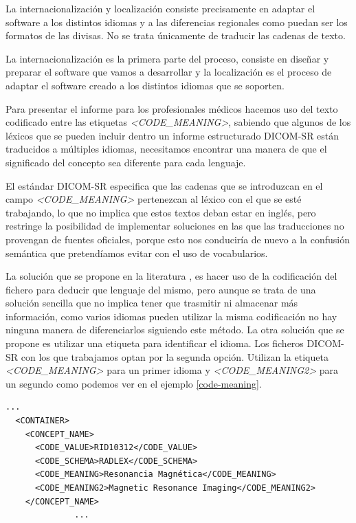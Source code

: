 La internacionalización y localización consiste precisamente en adaptar el software a los distintos idiomas y a las diferencias regionales como puedan ser los formatos de las divisas. No se trata únicamente de traducir las cadenas de texto.\par 
La internacionalización es la primera parte del proceso, consiste en diseñar y preparar el software que vamos a desarrollar y la localización es el proceso de adaptar el software creado a los distintos idiomas que se soporten.\cite{Uren:1993:ISI:562752}\medskip\par

Para presentar el informe para los profesionales médicos hacemos uso del texto codificado entre las etiquetas \emph{<CODE\_MEANING>}, sabiendo que algunos de los léxicos que se pueden incluir dentro un informe estructurado DICOM-SR están traducidos a múltiples idiomas, necesitamos encontrar una manera de que el significado del concepto sea diferente para cada lenguaje.\par
El estándar DICOM-SR especifica que las cadenas que se introduzcan en el campo \emph{<CODE\_MEANING>} pertenezcan al léxico con el que se esté trabajando, lo que no implica que estos textos deban estar en inglés, pero restringe la posibilidad de implementar soluciones en las que las traducciones no provengan de fuentes oficiales, porque esto nos conduciría de nuevo a la confusión semántica que pretendíamos evitar con el uso de vocabularios.\par
La solución que se propone en la literatura \cite{clunie2000dicom}, es hacer uso de la codificación del fichero para deducir que lenguaje del mismo, pero aunque se trata de una solución sencilla que no implica tener que trasmitir ni almacenar más información, como varios idiomas pueden utilizar la misma codificación no hay ninguna manera de diferenciarlos siguiendo este método. La otra solución que se propone es utilizar una etiqueta para identificar el idioma. Los ficheros DICOM-SR con los que trabajamos optan por la segunda opción. Utilizan la etiqueta \emph{<CODE\_MEANING>} para un primer idioma y \emph{<CODE\_MEANING2>} para un segundo como podemos ver en el ejemplo \ref{code-meaning}.\par

\lstset{escapechar=@,style=dicom}
\renewcommand*\lstlistingname{Código}
\begin{lstlisting}[label=code-meaning,caption=Internacionación y localización en ficheros DICOM-SR.]
		  ...
  <CONTAINER>
    <CONCEPT_NAME>
      <CODE_VALUE>RID10312</CODE_VALUE>
      <CODE_SCHEMA>RADLEX</CODE_SCHEMA>
      <CODE_MEANING>Resonancia Magnética</CODE_MEANING>
      <CODE_MEANING2>Magnetic Resonance Imaging</CODE_MEANING2>
    </CONCEPT_NAME>
              ...
\end{lstlisting}


